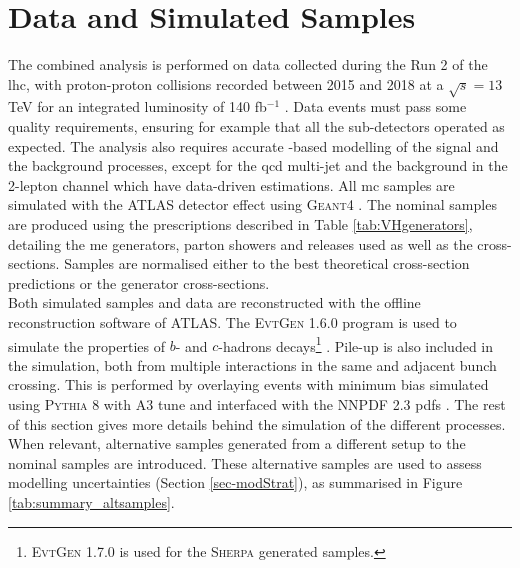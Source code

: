 \section{Data and Simulated Samples}\label{sec-datasets} %
The combined analysis is performed on data collected during the Run 2 of the \gls{lhc}, with proton-proton collisions recorded between 2015 and 2018 at a $\sqrt{s} = 13$ TeV for an integrated luminosity of 140 fb$^{-1}$ \cite{ATLAS:2022hro}. Data events must pass some quality requirements, ensuring for example that all the sub-detectors operated as expected. The analysis also requires accurate -based modelling of the signal and the background processes, except for the \gls{qcd} multi-jet and the \ttb background in the 2-lepton channel which have data-driven estimations. All \gls{mc} samples are simulated with the ATLAS detector effect \cite{ATLASSimulationInfra} using \textsc{Geant4} \cite{Agostinelli:602040}. The nominal samples are produced using the prescriptions described in Table \ref{tab:VHgenerators}, detailing the \gls{me} generators, parton showers and  releases used as well as the cross-sections. Samples are normalised either to the best theoretical cross-section predictions or the generator cross-sections. \\



Both simulated samples and data are reconstructed with the offline reconstruction software of ATLAS. The \textsc{EvtGen} 1.6.0 program is used to simulate the properties of $b$- and $c$-hadrons decays\footnote{\textsc{EvtGen} 1.7.0 is used for the \textsc{Sherpa} generated samples.} \cite{LANGE2001152}. Pile-up is also included in the simulation, both from multiple interactions in the same and adjacent bunch crossing. This is performed by overlaying events with minimum bias simulated using \textsc{\textsc{Pythia}} 8 with A3 tune and interfaced with the \textsc{NNPDF} 2.3 \gls{pdf}s \cite{SJOSTRAND2015159}. The rest of this section gives more details behind the simulation of the different processes. When relevant, alternative samples generated from a different setup to the nominal samples are introduced. These alternative samples are used to assess modelling uncertainties (Section \ref{sec-modStrat}), as summarised in Figure \ref{tab:summary_altsamples}.

